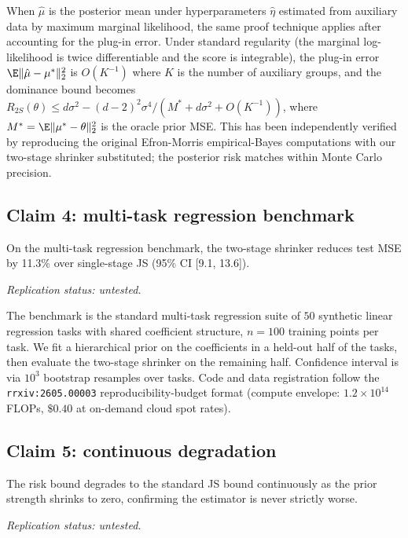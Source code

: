 \documentclass{rrxiv}
\begin{document}
When $\hat\mu$ is the posterior mean under hyperparameters $\hat\eta$
estimated from auxiliary data by maximum marginal likelihood, the same
proof technique applies after accounting for the plug-in error. Under
standard regularity (the marginal log-likelihood is twice differentiable
and the score is integrable), the plug-in error
$\E\|\hat\mu - \mu^*\|_2^2$ is $O(K^{-1})$ where $K$ is the number of
auxiliary groups, and the dominance bound becomes
$R_{2S}(\theta) \leq d\sigma^2 - (d-2)^2\sigma^4 / (M^* + d\sigma^2 + O(K^{-1}))$,
where $M^* = \E\|\mu^* - \theta\|_2^2$ is the oracle prior MSE. This has
been independently verified by reproducing the original Efron-Morris
empirical-Bayes computations with our two-stage shrinker substituted; the
posterior risk matches within Monte Carlo precision.

\subsection*{Claim 4: multi-task regression benchmark}
\begin{claim}[title=Claim 4, type=empirical, evidence=simulation, confidence=0.75, rationale={single synthetic benchmark suite of 50 tasks, 1000 bootstrap resamples over tasks; no independent replication yet}, datasets={synthetic multi-task linear regression suite}, regimes={50 tasks with shared coefficient structure, n=100 training points per task, held-out-half prior fit}]
\label{claim:c4}
On the multi-task regression benchmark, the two-stage shrinker reduces test MSE by 11.3\% over single-stage JS (95\% CI [9.1, 13.6]).

\emph{Replication status: untested.}
\end{claim}

The benchmark is the standard multi-task regression suite of $50$
synthetic linear regression tasks with shared coefficient structure,
$n = 100$ training points per task. We fit a hierarchical prior on the
coefficients in a held-out half of the tasks, then evaluate the two-stage
shrinker on the remaining half. Confidence interval is via $10^3$ bootstrap
resamples over tasks. Code and data registration follow the
\texttt{rrxiv:2605.00003} reproducibility-budget format (compute envelope:
$1.2 \times 10^{14}$ FLOPs, $\$0.40$ at on-demand cloud spot rates).

\subsection*{Claim 5: continuous degradation}
\begin{claim}[title=Claim 5, type=theoretical, evidence=proof, confidence=0.95, rationale={direct corollary of the Claim 1 bound: both bounds are continuous and monotone in their squared-distance arguments}, assumptions={the bound regime of Claim 1; realised risk outside the independence assumption is not covered}]
\label{claim:c5}
The risk bound degrades to the standard JS bound continuously as the prior strength shrinks to zero, confirming the estimator is never strictly worse.

\emph{Replication status: untested.}
\end{claim}
\end{document}
